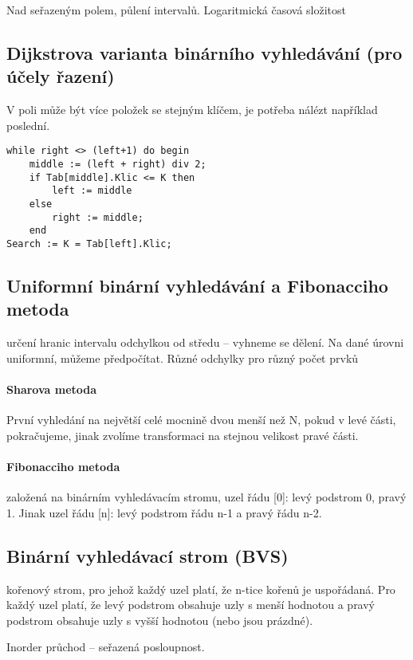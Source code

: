 \documentclass[a4paper, 11pt]{report}
\begin{document}
Nad seřazeným polem, půlení intervalů. Logaritmická časová složitost

\subsection{Dijkstrova varianta binárního vyhledávání (pro účely řazení)}

V poli může být více položek se stejným klíčem, je potřeba nálézt například poslední.
\begin{lstlisting}
while right <> (left+1) do begin
	middle := (left + right) div 2;
	if Tab[middle].Klic <= K then
		left := middle
	else
		right := middle;
	end
Search := K = Tab[left].Klic;
\end{lstlisting}

\subsection{Uniformní binární vyhledávání a Fibonacciho metoda}

určení hranic intervalu odchylkou od středu -- vyhneme se dělení. Na dané úrovni uniformní, můžeme předpočítat. Různé odchylky pro různý počet prvků

\paragraph{Sharova metoda}
První vyhledání na největší celé mocnině dvou menší než N, pokud v levé části, pokračujeme, jinak zvolíme transformaci na stejnou velikost pravé části.

\paragraph{Fibonacciho metoda}
založená na binárním vyhledávacím stromu, uzel řádu [0]: levý podstrom 0, pravý 1. Jinak uzel řádu [n]: levý podstrom řádu n-1 a pravý řádu n-2.

\subsection{Binární vyhledávací strom (BVS)}
kořenový strom, pro jehož každý uzel platí, že n-tice kořenů je uspořádaná. Pro každý uzel platí, že levý podstrom obsahuje uzly s menší hodnotou a pravý podstrom obsahuje uzly s vyšší hodnotou (nebo jsou prázdné).

Inorder průchod -- seřazená posloupnost.
\end{document}
